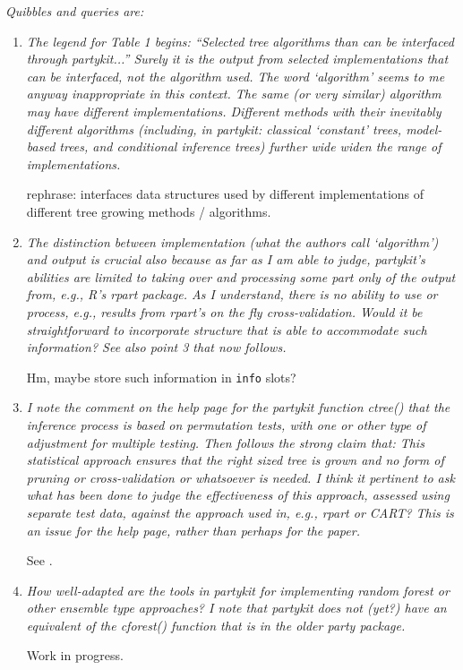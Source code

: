 \documentclass{article}
\begin{document}
\textit{Quibbles and queries are:}
\begin{enumerate}
\item 
\textit{
The legend for Table 1 begins: ``Selected tree algorithms than can be
interfaced through partykit...''  Surely it is the output from selected
implementations that can be interfaced, not the algorithm used.  The word
‘algorithm’ seems to me anyway inappropriate in this context.  The same (or
very similar) algorithm may have different implementations.  Different
methods with their inevitably different algorithms (including, in partykit:
classical `constant’ trees, model-based trees, and conditional inference
trees) further wide widen the range of implementations.}

rephrase: interfaces data structures used by different implementations of different
tree growing methods / algorithms.

\item 
\textit{
The distinction between implementation (what the authors call `algorithm’)
and output is crucial also because as far as I am able to judge, partykit’s
abilities are limited to taking over and processing some part only of the
output from, e.g., R’s rpart package.  As I understand, there is no ability
to use or process, e.g., results from rpart’s on the fly cross-validation. 
Would it be straightforward to incorporate structure that is able to
accommodate such information?  See also point 3 that now follows.}

Hm, maybe store such information in \texttt{info} slots?

\item 
\textit{
I note the comment on the help page for the partykit function ctree() that
the inference process is based on permutation tests, with one or other type
of adjustment for multiple testing.  Then follows the strong claim that:
This statistical approach ensures that the right sized tree is grown and no
form of pruning or cross-validation or whatsoever is needed.  I think it
pertinent to ask what has been done to judge the effectiveness of this
approach, assessed using separate test data, against the approach used in,
e.g., rpart or CART?  This is an issue for the help page, rather than
perhaps for the paper.}

See \citep{Hothorn+Hornik+Zeileis:2006}.

\item 
\textit{
How well-adapted are the tools in partykit for implementing random forest
or other ensemble type approaches? I note that partykit does not (yet?) have
an equivalent of the cforest() function that is in the older party package.
}

Work in progress.

\end{enumerate}
\end{document}
